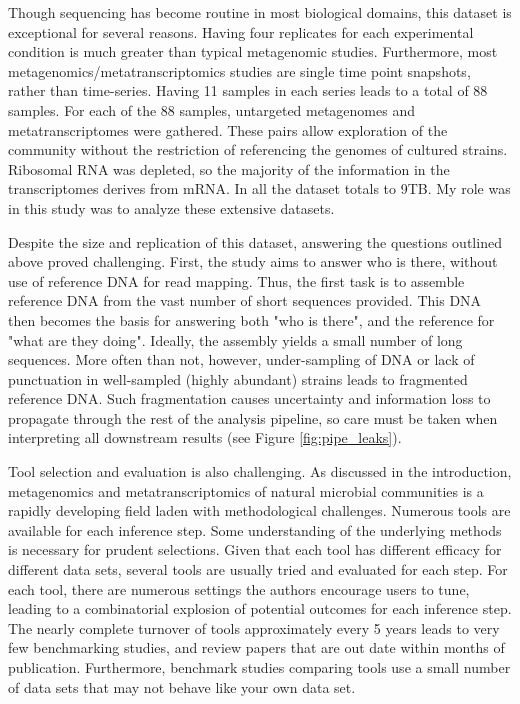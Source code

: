Though sequencing has become routine in most biological domains, this dataset is exceptional for several reasons.
Having four replicates for each experimental condition is much greater than typical metagenomic studies.
Furthermore, most metagenomics/metatranscriptomics studies are single time point snapshots, rather than time-series.
Having 11 samples in each series leads to a total of 88 samples.
For each of the 88 samples, untargeted metagenomes and metatranscriptomes were gathered.
These pairs allow exploration of the community without the restriction of referencing the genomes of cultured strains.
Ribosomal RNA was depleted, so the majority of the information in the transcriptomes derives from mRNA.
In all the dataset totals to 9TB.
My role was in this study was to analyze these extensive datasets.

Despite the size and replication of this dataset, answering the questions outlined above proved challenging.
First, the study aims to answer who is there, without use of reference DNA for read mapping.  %
Thus, the first task is to assemble reference DNA from the vast number of short sequences provided.
This DNA then becomes the basis for answering both "who is there", and the reference for "what are they doing".
Ideally, the assembly yields a small number of long sequences.
More often than not, however, under-sampling of DNA or lack of punctuation in well-sampled (highly abundant) strains leads to fragmented reference DNA.
Such fragmentation causes uncertainty and information loss to propagate through the rest of the analysis pipeline, so care must be taken when interpreting all downstream results (see Figure \ref{fig:pipe_leaks}).

Tool selection and evaluation is also challenging.
As discussed in the introduction, metagenomics and metatranscriptomics of natural microbial communities is a rapidly developing field laden with methodological challenges.
Numerous tools are available for each inference step.
Some understanding of the underlying methods is necessary for prudent selections.
Given that each tool has different efficacy for different data sets, several tools are usually tried and evaluated for each step.
For each tool, there are numerous settings the authors encourage users to tune, leading to a combinatorial explosion of potential outcomes for each inference step.
The nearly complete turnover of tools approximately every 5 years leads to very few benchmarking studies, and review papers that are out date within months of publication.
Furthermore, benchmark studies comparing tools use a small number of data sets that may not behave like your own data set.

